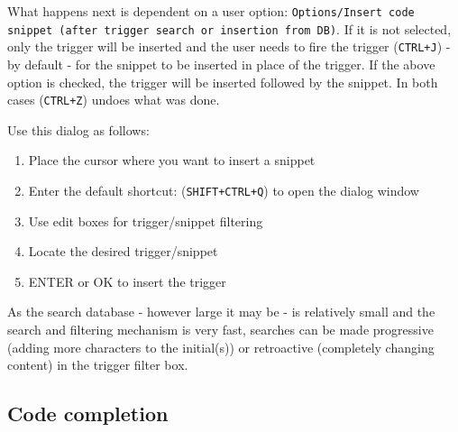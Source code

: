 What happens next is dependent on a user option: \texttt{Options/Insert code snippet (after trigger search or insertion from DB)}.
If it is not selected, only the trigger will be inserted and the user needs to fire the
trigger (\texttt{CTRL+J}) - by default - for the snippet to be inserted in place of the trigger.
If the above option is checked, the trigger will be inserted followed by the snippet.
In both cases (\texttt{CTRL+Z}) undoes what was done.

Use this dialog as follows:
\begin{enumerate}
  \item Place the cursor where you want to insert a snippet
  \item Enter the default shortcut: (\texttt{SHIFT+CTRL+Q}) to open the dialog window
  \item Use edit boxes for trigger/snippet filtering
  \item Locate the desired trigger/snippet
  \item ENTER or OK to insert the trigger
\end{enumerate}

As the search database - however large it may be - is relatively small and the search and filtering
mechanism is very fast, searches can be made progressive (adding more characters to the initial(s))
or retroactive (completely changing content) in the trigger filter box.


\hypertarget{dlg_additional_dialogs_code_completion}{}
\subsection{Code completion}

